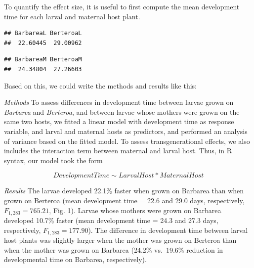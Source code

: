 \documentclass[
]{article}
\begin{document}
To quantify the effect size, it is useful to first compute the mean
development time for each larval and maternal host plant.

\begin{verbatim}
## BarbareaL BerteroaL 
##  22.60445  29.00962
\end{verbatim}

\begin{verbatim}
## BarbareaM BerteroaM 
##  24.34804  27.26603
\end{verbatim}

Based on this, we could write the methods and results like this:

\emph{Methods} To assess differences in development time between larvae
grown on \emph{Barbarea} and \emph{Berteroa}, and between larvae whose
mothers were grown on the same two hosts, we fitted a linear model with
development time as response variable, and larval and maternal hosts as
predictors, and performed an analysis of variance based on the fitted
model. To assess transgenerational effects, we also includes the
interaction term between maternal and larval host. Thus, in R syntax,
our model took the form

\[Development Time \sim Larval Host * Maternal Host\]

\emph{Results} The larvae developed 22.1\% faster when grown on Barbarea
than when grown on Berteroa (mean development time = 22.6 and 29.0 days,
respectively, \(F_{1,283}=765.21\), Fig. 1). Larvae whose mothers were
grown on Barbarea developed 10.7\% faster (mean development time = 24.3
and 27.3 days, respectively, \(F_{1,283}=177.90\)). The difference in
development time between larval host plants was slightly larger when the
mother was grown on Berteroa than when the mother was grown on Barbarea
(24.2\% vs.~19.6\% reduction in developmental time on Barbarea,
respectively).
\end{document}
